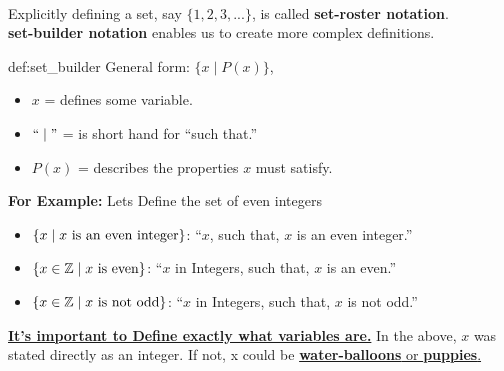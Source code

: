 \noindent
\hrulefill\\

\vspace{1em}

\noindent
Explicitly defining a set, say $\{1, 2, 3, ...\}$, is called \textbf{set-roster notation}.\\
\textbf{set-builder notation} enables us to create more complex definitions.

\begin{Def}{def:set_builder}
    General form: $\{x \mid P(x)\}$,
    \begin{itemize}
        \item $x$ = defines some variable.
        \item $``\mid"$ = is short hand for ``such that.''
        \item $P(x)$ = describes the properties $x$ must satisfy.
    \end{itemize}
\end{Def}

\noindent
\textbf{For Example:} Lets Define the set of even integers\\
\vspace{-1em}
\begin{itemize}
    \item $\{x \mid x \textnormal{ is an even integer}\}$: ``$x$, such that, $x$ is an even integer.''
    \item $\{x \in \mathbb{Z} \mid x \textnormal{ is even}\}$: ``$x$ in Integers, such that, $x$ is an even.''
    \item $\{x \in \mathbb{Z} \mid x \textnormal{ is not odd}\}$: ``$x$ in Integers, such that, $x$ is not odd.''
\end{itemize}

\noindent
\underline{\textbf{It's important to Define exactly what variables are.}}
In the above, $x$ was stated directly as an integer. If not, x could be \underline{\textbf{water-balloons} or \textbf{puppies}.}
